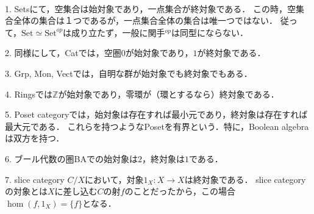 \documentclass[uplatex, 12pt, dvipdfmx]{jsarticle}
\begin{document}
\begin{example}　

    1. Setsにて，空集合は始対象であり，一点集合が終対象である．
    この時，空集合全体の集合は１つであるが，一点集合全体の集合は唯一つではない．
    従って，$\mathrm{Set}\simeq\mathrm{Set}^{op}$は成り立たず，一般に関手${}^{op}$は同型にならない．

    \vspace{1cm}

    2. 同様にして，Catでは，空圏$0$が始対象であり，$1$が終対象である．

    \vspace{1cm}

    3. Grp, Mon, Vectでは，自明な群が始対象でも終対象でもある．

    \vspace{1cm}

    4. Ringsでは$\mathbb{Z}$が始対象であり，零環が（環とするなら）終対象である．

    \vspace{1cm}

    5. Poset categoryでは，始対象は存在すれば最小元であり，終対象は存在すれば最大元である．
    これらを持つようなPosetを有界という．特に，Boolean algebraは双方を持つ．

    \vspace{1cm}

    6. ブール代数の圏BAでの始対象は$2$，終対象は$1$である．

    \vspace{1cm}

    7. slice category $C/X$において，対象$1_X:X\to X$は終対象である．
    slice category の対象とは$X$に差し込む$C$の射$f$のことだったから，この場合$\hom(f,1_X)=\{f\}$となる．
    \begin{center}
    \end{center}
\end{example}
\vspace{1cm}
\end{document}
